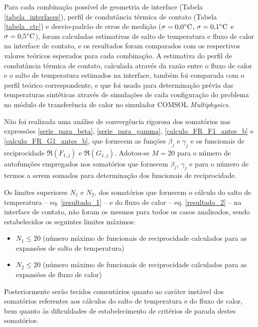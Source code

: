 Para cada combinação possível de geometria de interface (Tabela \ref{tabela_interfaces}), perfil de condutância térmica de contato (Tabela \ref{tabela_ctc}) e desvio-padrão de erros de medição ($\sigma = \text{0,0}\celsius$, $\sigma = \text{0,1}\celsius$ e $\sigma = \text{0,5}\celsius$), foram calculadas estimativas de salto de temperatura e fluxo de calor na interface de contato, e os resultados foram comparados com os respectivos valores teóricos esperados para cada combinação. A estimativa do perfil de condutância térmica de contato, calculada através da razão entre o fluxo de calor e o salto de temperatura estimados na interface, também foi comparada com o perfil teórico correspondente, e que foi usado para determinação prévia das temperaturas sintéticas através de simulações de cada configuração do problema no módulo de transferência de calor no simulador COMSOL \textit{Multiphysics}\textsuperscript{\textregistered}.

Não foi realizada uma análise de convergência rigorosa dos somatórios nas expressões \eqref{serie_para_beta}, \eqref{serie_para_gamma}, \eqref{calculo_FR_F1_antes_b} e \eqref{calculo_FR_G1_antes_b}, que fornecem as funções $\beta_j$ e $\gamma_j$ e os funcionais de reciprocidade $\Re(F_{1,j})$ e $\Re(G_{1,j})$. Adotou-se $M=20$ para o número de autofunções empregados nos somatórios que fornecem $\beta_j$, $\gamma_j$ e para o número de termos a serem somados para determinação dos funcionais de reciprocidade.

Os limites superiores $N_1$ e $N_2$, dos somatórios que fornecem o cálculo do salto de temperatura -- eq. \eqref{resultado_1} -- e do fluxo de calor -- eq. \eqref{resultado_2} -- na interface de contato, não foram os mesmos para todos os casos analisados, sendo estabelecidos os seguintes limites máximos:
\begin{itemize}
	\item $N_1 \le 20$ (número máximo de funcionais de reciprocidade calculados para as expansões de salto de temperatura)
	\item $N_2 \le 20$ (número máximo de funcionais de reciprocidade calculados para as expansões de fluxo de calor)
\end{itemize}

Posteriormente serão tecidos comentários quanto ao caráter instável dos somatórios referentes aos cálculos do salto de temperatura e do fluxo de calor, bem quanto às dificuldades de estabelecimento de critérios de parada destes somatórios.

